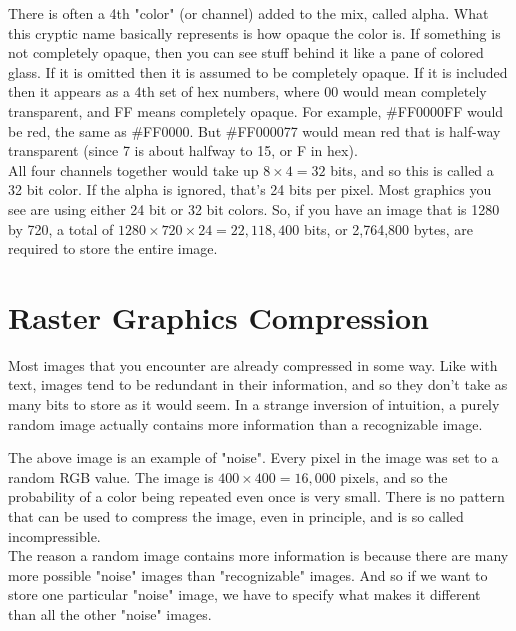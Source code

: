 There is often a 4th "color" (or channel) added to the mix, called alpha. What this cryptic name basically represents is how opaque the color is. If something is not completely opaque, then you can see stuff behind it like a pane of colored glass. If it is omitted then it is assumed to be completely opaque. If it is included then it appears as a 4th set of hex numbers, where 00 would mean completely transparent, and FF means completely opaque. For example, \#FF0000FF would be red, the same as \#FF0000. But \#FF000077 would mean red that is half-way transparent (since 7 is about halfway to 15, or F in hex).\\

All four channels together would take up \(8\times 4 = 32 \) bits, and so this is called a 32 bit color. If the alpha is ignored, that's 24 bits per pixel. Most graphics you see are using either 24 bit or 32 bit colors.  So, if you have an image that is 1280 by 720, a total of \(1280\times720\times24 = 22,118,400\) bits, or 2,764,800 bytes, are required to store the entire image.\\

\section{Raster Graphics Compression}

Most images that you encounter are already compressed in some way. Like with text, images tend to be redundant in their information, and so they don't take as many bits to store as it would seem. In a strange inversion of intuition, a purely random image actually contains more information than a recognizable image.

\begin{center}\end{center}

The above image is an example of "noise". Every pixel in the image was set to a random RGB value. The image is \(400 \times 400 = 16,000\) pixels, and so the probability of a color being repeated even once is very small. There is no pattern that can be used to compress the image, even in principle, and is so called incompressible.\\

The reason a random image contains more information is because there are many more possible "noise" images than "recognizable" images. And so if we want to store one particular "noise" image, we have to specify what makes it different than all the other "noise" images.\\

